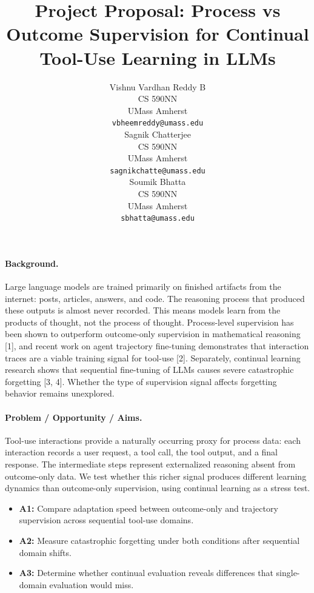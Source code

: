 \documentclass{article}
\title{Project Proposal: Process vs Outcome Supervision for Continual Tool-Use Learning in LLMs}
\author{%
  Vishnu Vardhan Reddy B \\
  CS 590NN \\
  UMass Amherst \\
  \texttt{vbheemreddy@umass.edu} \\
  \And
  Sagnik Chatterjee \\
  CS 590NN \\
  UMass Amherst \\
  \texttt{sagnikchatte@umass.edu} \\
  \And
  Soumik Bhatta \\
  CS 590NN \\
  UMass Amherst \\
  \texttt{sbhatta@umass.edu} \\
}
\begin{document}
\maketitle

\vspace{-0.5cm}

\paragraph{Background.}
Large language models are trained primarily on finished artifacts from the internet: posts, articles, answers, and code. The reasoning process that produced these outputs is almost never recorded. This means models learn from the products of thought, not the process of thought. Process-level supervision has been shown to outperform outcome-only supervision in mathematical reasoning [1], and recent work on agent trajectory fine-tuning demonstrates that interaction traces are a viable training signal for tool-use [2]. Separately, continual learning research shows that sequential fine-tuning of LLMs causes severe catastrophic forgetting [3, 4]. Whether the type of supervision signal affects forgetting behavior remains unexplored.

\paragraph{Problem / Opportunity / Aims.}
Tool-use interactions provide a naturally occurring proxy for process data: each interaction records a user request, a tool call, the tool output, and a final response. The intermediate steps represent externalized reasoning absent from outcome-only data. We test whether this richer signal produces different learning dynamics than outcome-only supervision, using continual learning as a stress test.

\vspace{-0.1cm}
\begin{itemize}[nosep, leftmargin=*]
  \item \textbf{A1:} Compare adaptation speed between outcome-only and trajectory supervision across sequential tool-use domains.
  \item \textbf{A2:} Measure catastrophic forgetting under both conditions after sequential domain shifts.
  \item \textbf{A3:} Determine whether continual evaluation reveals differences that single-domain evaluation would miss.
\end{itemize}
\end{document}
